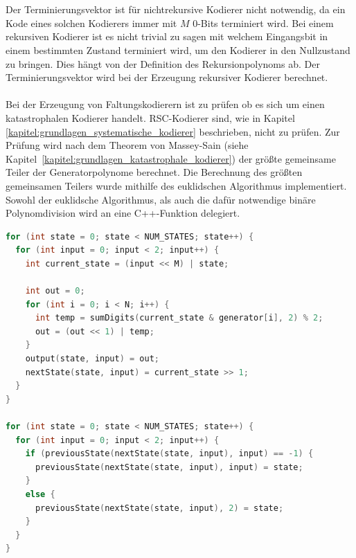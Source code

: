\\
\\
Der Terminierungsvektor ist für nichtrekursive Kodierer nicht notwendig, da ein Kode eines solchen Kodierers immer mit $M$ 0-Bits terminiert wird. Bei einem rekursiven Kodierer ist es nicht trivial zu sagen mit welchem Eingangsbit in einem bestimmten Zustand terminiert wird, um den Kodierer in den Nullzustand zu bringen. Dies hängt von der Definition des Rekursionpolynoms ab. Der Terminierungsvektor wird bei der Erzeugung rekursiver Kodierer berechnet.
\\
\\
Bei der Erzeugung von Faltungskodierern ist zu prüfen ob es sich um einen katastrophalen Kodierer handelt. RSC-Kodierer sind, wie in Kapitel \ref{kapitel:grundlagen_systematische_kodierer} beschrieben, nicht zu prüfen. Zur Prüfung wird nach dem Theorem von Massey-Sain (siehe Kapitel~\ref{kapitel:grundlagen_katastrophale_kodierer}) der größte gemeinsame Teiler der Generatorpolynome berechnet. Die Berechnung des größten gemeinsamen Teilers wurde mithilfe des euklidschen Algorithmus implementiert. Sowohl der euklidsche Algorithmus, als auch die dafür notwendige binäre Polynomdivision wird an eine C++-Funktion delegiert.
\begin{lstlisting}[language=C++,caption=Codeausschnitt der Implementierung der Erzeugung von Faltungskodierer, label={lst:generate_coder}, float=!th, basicstyle=\ttfamily\scriptsize]
for (int state = 0; state < NUM_STATES; state++) {
  for (int input = 0; input < 2; input++) {
    int current_state = (input << M) | state;

    int out = 0;
    for (int i = 0; i < N; i++) {
      int temp = sumDigits(current_state & generator[i], 2) % 2;
      out = (out << 1) | temp;
    }
    output(state, input) = out;
    nextState(state, input) = current_state >> 1;
  }
}

for (int state = 0; state < NUM_STATES; state++) {
  for (int input = 0; input < 2; input++) {
    if (previousState(nextState(state, input), input) == -1) {
      previousState(nextState(state, input), input) = state;
    }
    else {
      previousState(nextState(state, input), 2) = state;
    }
  }
}
\end{lstlisting}
